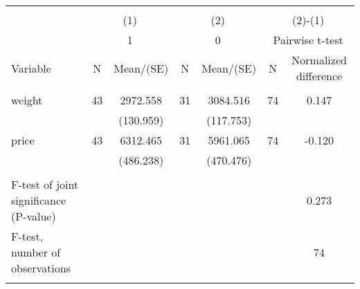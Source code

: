 
\begin{tabular}{@{\extracolsep{5pt}}lcccccc}
\\[-1.8ex]\hline \hline \\[-1.8ex]
 & \multicolumn{2}{c}{(1)}  & \multicolumn{2}{c}{(2)}  & \multicolumn{2}{c}{(2)-(1)} \\
 & \multicolumn{2}{c}{1}  & \multicolumn{2}{c}{0}  & \multicolumn{2}{c}{Pairwise t-test}  \\
Variable & N & Mean/(SE) & N & Mean/(SE) & N & Normalized difference \\ \hline \\[-1.8ex] 
weight   & 43    & 2972.558    & 31    & 3084.516    & 74    & 0.147   \\
 &   & (130.959)  &   & (117.753)  &   &   \\
price   & 43    & 6312.465    & 31    & 5961.065    & 74    & -0.120   \\
 &   & (486.238)  &   & (470.476)  &   &   \\
\hline \\[-1.8ex]
F-test of joint significance (P-value) & &   & &     & &  0.273   \\
F-test, number of observations & &   & &   & &  74   \\
\hline \\[-1.8ex]

\end{tabular}
